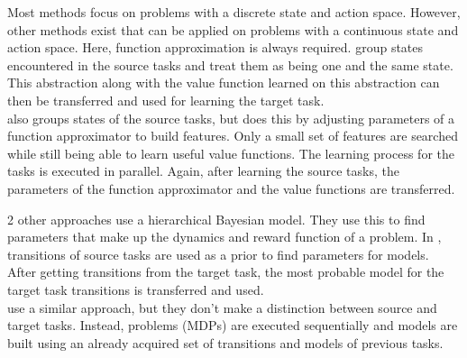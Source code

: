 Most methods focus on problems with a discrete state and action space. However, other methods exist that can be applied on problems with a continuous state and action space.
Here, function approximation is always required. \cite{walsh2006transferring} group states encountered in the source tasks and treat them as being one and the same state.
This abstraction along with the value function learned on this abstraction can then be transferred and used for learning the target task.\\
\cite{lazaric2008knowledge} also groups states of the source tasks, but does this by adjusting parameters of a function approximator to build features.
Only a small set of features are searched while still being able to learn useful value functions. The learning process for the tasks is executed in parallel.
Again, after learning the source tasks, the parameters of the function approximator and the value functions are transferred.

2 other approaches use a hierarchical Bayesian model. They use this to find parameters that make up the dynamics and reward function of a problem. In \cite{sunmola2006model}, transitions of source tasks are used as a prior to find parameters for models.
After getting transitions from the target task, the most probable model for the target task transitions is transferred and used.\\
\cite{conf/icml/WilsonFRT07} use a similar approach, but they don't make a distinction between source and target tasks. Instead, problems (MDPs) are executed sequentially and models are built using an already acquired set of transitions and models of previous tasks.\\

